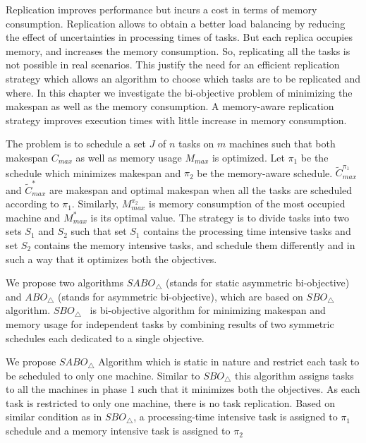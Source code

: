 \label{ch5}
\label{Intro}

 Replication improves performance but incurs a cost in terms of memory consumption.  
 Replication allows to obtain a better load balancing by reducing the effect of 
 uncertainties in processing times of tasks. But each replica occupies memory, and increases the memory consumption. 
 So, replicating all the tasks is not possible in real scenarios. This justify the need for an efficient replication 
 strategy which allows an algorithm to choose which tasks are to be replicated and where.
 In this chapter we investigate the bi-objective problem of minimizing the makespan as well as the memory consumption. A memory-aware replication strategy improves execution times with little increase in memory consumption. 

 The problem is to schedule a set $J$ of $n$ tasks on $m$ machines such that both makespan $C_{max}$ as well as memory usage $M_{max}$ is optimized.  
  Let $\pi_1$ be the schedule  which minimizes makespan and $\pi_2$ be the memory-aware schedule. $\tilde{C}^{\pi_1}_{max}$ and $\tilde{C}^{*}_{max}$ are makespan and optimal makespan when all the tasks are scheduled according to $\pi_1$. Similarly, $M^{\pi_2}_{max}$ is  memory consumption of the most  occupied machine and $M^*_{max}$ is its optimal value. The strategy is to divide tasks into two sets $S_1$ and $S_2$ such that set $S_1$ contains the processing time intensive tasks and set $S_2$ contains the memory intensive tasks, and schedule them differently and in such a way that it optimizes both the objectives. 
  
  We propose two algorithms $SABO_\triangle$ (stands for static asymmetric bi-objective) and $ABO_\triangle$ (stands for asymmetric bi-objective), which are based on $SBO_\triangle$ algorithm. $SBO_\triangle$~\cite{10.1109/IPDPS.2008.4536292} is bi-objective algorithm for minimizing makespan and memory usage for independent tasks by combining results of two symmetric schedules each dedicated to a single objective.
  
                  
                  We propose $SABO_\triangle$ Algorithm which is static in nature and restrict each task to be scheduled to only one machine. Similar to $SBO_\triangle$ this algorithm assigns tasks to all the machines in phase 1 such that it minimizes both the objectives. As each task is restricted to only one machine, there is no task replication. Based on similar condition as in $SBO_\triangle$, a processing-time intensive task is assigned to $\pi_1$ schedule and a memory intensive task is assigned to $\pi_2$
                  
